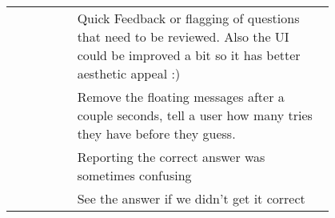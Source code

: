 {\begin{longtable}{R|p{0.8\linewidth}}
		& Quick Feedback or flagging of questions that need to be reviewed. Also the UI could be improved a bit so it has better aesthetic appeal :)                                                                                                                                                                                                                                                                                                                                                                                                                                                                                                                                                                                                       \\
		& Remove the floating messages after a couple seconds, tell a user how many tries they have before they guess.                                                                                                                                                                                                                                                                                                                                                                                                                                                                                                                                                                                                                                     \\
		& Reporting the correct answer was sometimes confusing                                                                                                                                                                                                                                                                                                                                                                                                                                                                                                                                                                                                                                                                                             \\
		& See the answer if we didn't get it correct                                                                                                                                                                                                                                                                                                                                                                                                                                                                                                                                                                                                                                                                                                       \\

\end{longtable}}
